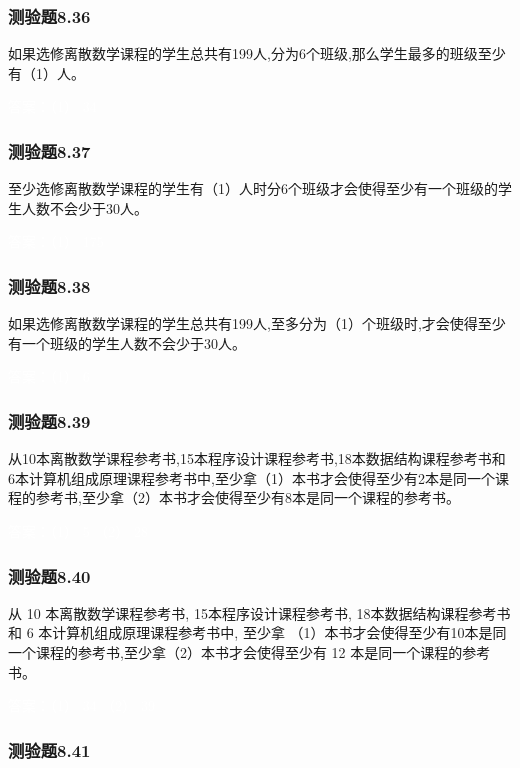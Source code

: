 \documentclass[UTF8, heading=true]{ctexart}
\begin{document}
\subsubsection{测验题8.36}
如果选修离散数学课程的学生总共有199人,分为6个班级,那么学生最多的班级至少有（1）人。

\textcolor{white}{答案：（1） 34}

\subsubsection{测验题8.37}

至少选修离散数学课程的学生有（1）人时分6个班级才会使得至少有一个班级的学生人数不会少于30人。

\textcolor{white}{答案：（1） 175}

\subsubsection{测验题8.38}

如果选修离散数学课程的学生总共有199人,至多分为（1）个班级时,才会使得至少有一个班级的学生人数不会少于30人。

\textcolor{white}{答案：（1） 6}


\subsubsection{测验题8.39}

从10本离散数学课程参考书,15本程序设计课程参考书,18本数据结构课程参考书和6本计算机组成原理课程参考书中,至少拿（1）本书才会使得至少有2本是同一个课程的参考书,至少拿（2）本书才会使得至少有8本是同一个课程的参考书。

\textcolor{white}{答案：（1） 5 （2） 28}

\subsubsection{测验题8.40}

从 10 本离散数学课程参考书, 15本程序设计课程参考书, 18本数据结构课程参考书和 6 本计算机组成原理课程参考书中, 至少拿
（1）本书才会使得至少有10本是同一个课程的参考书,至少拿（2）本书才会使得至少有 12 本是同一个课程的参考书。

\textcolor{white}{答案：（1） 34 （2） 39}

\subsubsection{测验题8.41}
\end{document}
